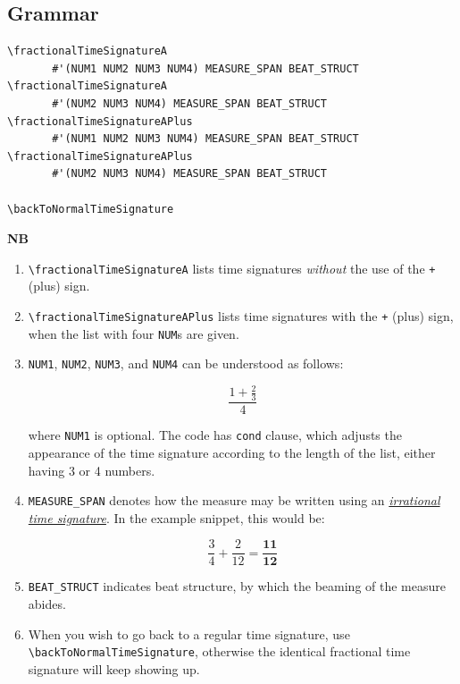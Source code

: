 \subsection{Grammar}
\begin{verbatim}
\fractionalTimeSignatureA 
       #'(NUM1 NUM2 NUM3 NUM4) MEASURE_SPAN BEAT_STRUCT
\fractionalTimeSignatureA 
       #'(NUM2 NUM3 NUM4) MEASURE_SPAN BEAT_STRUCT
\fractionalTimeSignatureAPlus 
       #'(NUM1 NUM2 NUM3 NUM4) MEASURE_SPAN BEAT_STRUCT
\fractionalTimeSignatureAPlus 
       #'(NUM2 NUM3 NUM4) MEASURE_SPAN BEAT_STRUCT

\backToNormalTimeSignature

\end{verbatim}
\textbf{NB} 
\begin{enumerate}
\item \verb|\fractionalTimeSignatureA| lists time signatures \textit{without} the use of the \verb|+| (plus) sign. 
\item \verb|\fractionalTimeSignatureAPlus| lists time signatures with the \verb|+| (plus) sign, when the list with four \verb|NUM|s are given.
\item \verb|NUM1|, \verb|NUM2|, \verb|NUM3|, and \verb|NUM4| can be understood as follows: \par
\[ \frac{1+\frac{2}{3}}{4} \] \par
where \verb|NUM1| is optional. The code has \verb|cond| clause, which adjusts the appearance of the time signature according to the length of the list, either having 3 or 4 numbers.
\item \verb|MEASURE_SPAN| denotes how the measure may be written using an \hyperref[sec:incompleteTuplet]{\textit{irrational time signature}}. In the example snippet, this would be: \par
\[ \frac{3}{4} + \frac{2}{12} = \mathbf{\frac{11}{12}}\] \par
\item \verb |BEAT_STRUCT| indicates beat structure, by which the beaming of the measure abides.

\item When you wish to go back to a regular time signature, use \verb|\backToNormalTimeSignature|, otherwise the identical fractional time signature will keep showing up.

\end{enumerate}
